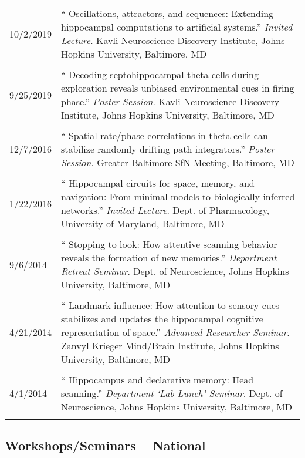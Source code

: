 \documentclass[10pt]{article}
\newcommand{\unpubtitle}[1]{{\color{hopkinsblue} #1}}
\begin{document}
\begin{tabular}{@{\hspace{0.2in}}l>{\raggedright\arraybackslash}p{}}
  10/2/2019 \hspace{0.1in} & ``\unpubtitle{Oscillations, attractors, and
  sequences: Extending hippocampal computations to artificial systems}.''
  \emph{Invited Lecture}. Kavli Neuroscience Discovery Institute, Johns Hopkins
  University, Baltimore, MD\\
  \tabularnewline
  9/25/2019 & ``\unpubtitle{Decoding septohippocampal theta cells during
  exploration reveals unbiased environmental cues in firing phase}.''
  \emph{Poster Session}. Kavli Neuroscience Discovery Institute, Johns Hopkins
  University, Baltimore, MD\\
  \tabularnewline
  12/7/2016 & ``\unpubtitle{Spatial rate/phase correlations in theta cells
  can stabilize randomly drifting path integrators}.'' \emph{Poster Session}.
  Greater Baltimore SfN Meeting, Baltimore, MD\\
  \tabularnewline
  1/22/2016 & ``\unpubtitle{Hippocampal circuits for space, memory, and
  navigation: From minimal models to biologically inferred networks}.''
  \emph{Invited Lecture}. Dept. of Pharmacology, University of Maryland,
  Baltimore, MD\\
  \tabularnewline
  9/6/2014 & ``\unpubtitle{Stopping to look: How attentive scanning behavior
  reveals the formation of new memories}.'' \emph{Department Retreat Seminar}.
  Dept. of Neuroscience, Johns Hopkins University, Baltimore, MD\\
  \tabularnewline
  4/21/2014 & ``\unpubtitle{Landmark influence: How attention to sensory cues
  stabilizes and updates the hippocampal cognitive representation of space}.''
  \emph{Advanced Researcher Seminar}. Zanvyl Krieger Mind/Brain Institute, Johns
  Hopkins University, Baltimore, MD\\
  \tabularnewline
  4/1/2014 & ``\unpubtitle{Hippocampus and declarative memory: Head scanning}.''
  \emph{Department `Lab Lunch' Seminar}. Dept. of Neuroscience, Johns Hopkins
  University, Baltimore, MD\\
  \tabularnewline
\end{tabular}

\subsection*{Workshops/Seminars -- National}
\end{document}

